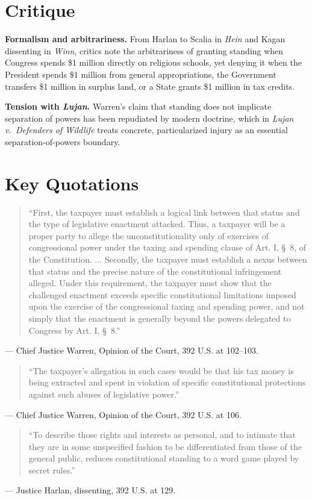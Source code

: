 \documentclass[12pt]{article}
\begin{document}
\section{Critique}

\textbf{Formalism and arbitrariness.} From Harlan to Scalia in \textit{Hein} and Kagan dissenting in \textit{Winn}, critics note the arbitrariness of granting standing when Congress spends \$1 million directly on religious schools, yet denying it when the President spends \$1 million from general appropriations, the Government transfers \$1 million in surplus land, or a State grants \$1 million in tax credits.

\textbf{Tension with \textit{Lujan}.} Warren's claim that standing does not implicate separation of powers has been repudiated by modern doctrine, which in \textit{Lujan v.\ Defenders of Wildlife} treats concrete, particularized injury as an essential separation-of-powers boundary.

\section{Key Quotations}

\begin{quote}
``First, the taxpayer must establish a logical link between that status and the type of legislative enactment attacked. Thus, a taxpayer will be a proper party to allege the unconstitutionality only of exercises of congressional power under the taxing and spending clause of Art. I, \S\ 8, of the Constitution. ... Secondly, the taxpayer must establish a nexus between that status and the precise nature of the constitutional infringement alleged. Under this requirement, the taxpayer must show that the challenged enactment exceeds specific constitutional limitations imposed upon the exercise of the congressional taxing and spending power, and not simply that the enactment is generally beyond the powers delegated to Congress by Art. I, \S\ 8.''
\end{quote}
\noindent --- Chief Justice Warren, Opinion of the Court, 392 U.S. at 102--103.

\begin{quote}
``The taxpayer's allegation in such cases would be that his tax money is being extracted and spent in violation of specific constitutional protections against such abuses of legislative power.''
\end{quote}
\noindent --- Chief Justice Warren, Opinion of the Court, 392 U.S. at 106.

\begin{quote}
``To describe those rights and interests as personal, and to intimate that they are in some unspecified fashion to be differentiated from those of the general public, reduces constitutional standing to a word game played by secret rules.''
\end{quote}
\noindent --- Justice Harlan, dissenting, 392 U.S. at 129.
\end{document}

